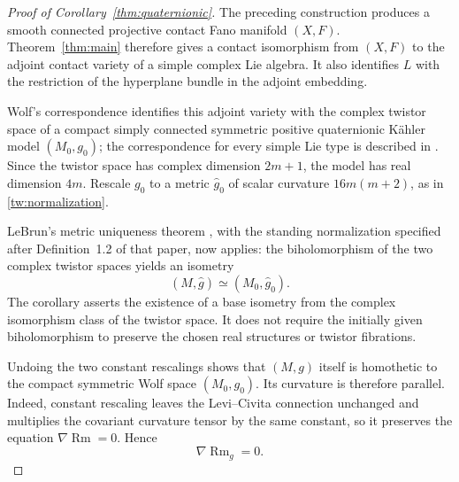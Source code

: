 \begin{proof}[Proof of Corollary~\ref{thm:quaternionic}]
The preceding construction produces a smooth connected projective
contact Fano manifold $(X,F)$. Theorem~\ref{thm:main} therefore gives
a contact isomorphism from $(X,F)$ to the adjoint contact variety
of a simple complex Lie algebra. It also identifies $L$ with the
restriction of the hyperplane bundle in the adjoint embedding.

Wolf's correspondence \cite{Wolf1965} identifies this adjoint variety
with the complex twistor space of a compact simply connected symmetric
positive quaternionic K\"ahler model $(M_0,g_0)$; the correspondence
for every simple Lie type is described in
\cite[Section~3.9, pp.~105--106]{LandsbergManivel2004}.
Since the twistor space has complex dimension $2m+1$, the model has
real dimension $4m$. Rescale $g_0$ to a metric $\widehat g_0$ of scalar
curvature $16m(m+2)$, as in \eqref{tw:normalization}.

LeBrun's metric uniqueness theorem
\cite[Corollary~3.4]{LeBrun1995}, with the standing normalization
specified after Definition~1.2 of that paper, now applies: the
biholomorphism of the two complex twistor spaces yields an isometry
\[
(M,\widehat g)\simeq(M_0,\widehat g_0).
\]
The corollary asserts the existence of a base isometry from the
complex isomorphism class of the twistor space. It does not require
the initially given biholomorphism to preserve the chosen real
structures or twistor fibrations.

Undoing the two constant rescalings shows that $(M,g)$ itself is
homothetic to the compact symmetric Wolf space $(M_0,g_0)$. Its curvature
is therefore parallel. Indeed, constant rescaling leaves the
Levi--Civita connection unchanged and multiplies the covariant curvature
tensor by the same constant, so it preserves the equation
$\nabla\operatorname{Rm}=0$. Hence
\[
\nabla\operatorname{Rm}_g=0.
\]
\end{proof}
